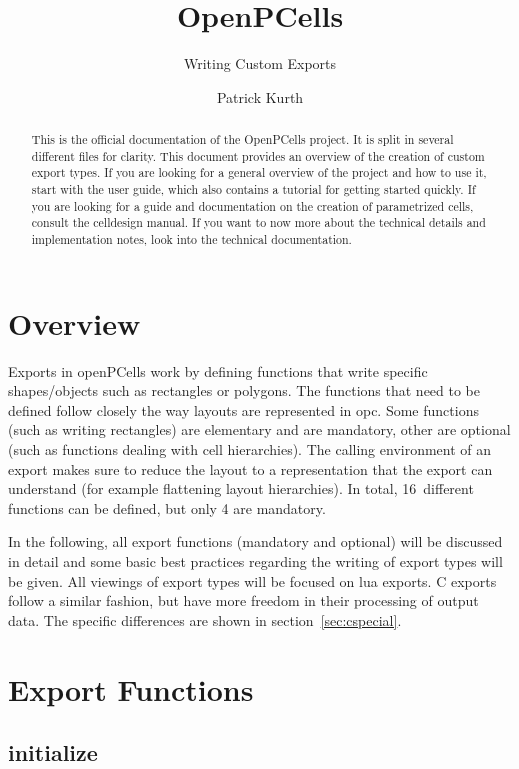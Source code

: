 

\title{OpenPCells}
\subtitle{Writing Custom Exports}
\author{Patrick Kurth}


\maketitle
\begin{abstract}
    \noindent This is the official documentation of the OpenPCells project. It is split in several different files for clarity. 
    This document provides an overview of the creation of custom export types.
    If you are looking for a general overview of the project and how to use it, start with the user guide, which also contains a tutorial for getting started quickly. 
    If you are looking for a guide and documentation on the creation of parametrized cells, consult the celldesign manual.
    If you want to now more about the technical details and implementation notes, look into the technical documentation.
\end{abstract}

\section{Overview}
Exports in openPCells work by defining functions that write specific shapes/objects such as rectangles or polygons.
The functions that need to be defined follow closely the way layouts are represented in opc.
Some functions (such as writing rectangles) are elementary and are mandatory, other are optional (such as functions dealing with cell hierarchies).
The calling environment of an export makes sure to reduce the layout to a representation that the export can understand (for example flattening layout hierarchies).
In total, 16~different functions can be defined, but only 4 are mandatory.

In the following, all export functions (mandatory and optional) will be discussed in detail and some basic best practices regarding the writing of export types will be given.
All viewings of export types will be focused on lua exports.
C exports follow a similar fashion, but have more freedom in their processing of output data.
The specific differences are shown in section~\ref{sec:cspecial}.

\section{Export Functions}
\subsection{initialize}
%
